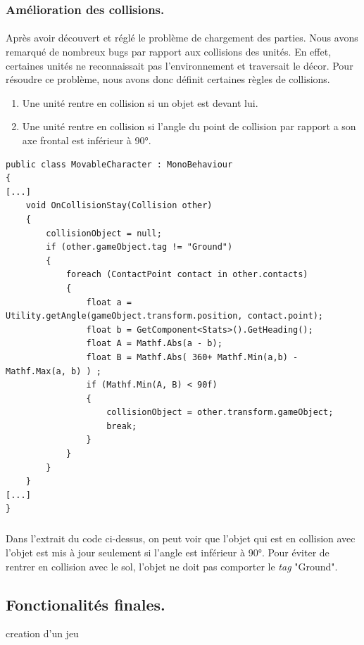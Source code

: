 \documentclass{report}
\begin{document}
\subsubsection{Amélioration des collisions.}
\paragraph{} Après avoir découvert et réglé le problème de chargement des parties. Nous avons remarqué de nombreux bugs par rapport aux collisions des unités. En effet, certaines unités ne reconnaissait pas l'environnement et traversait le décor. Pour résoudre ce problème, nous avons donc définit certaines règles de collisions.
\begin{enumerate}
\item Une unité rentre en collision si un objet est devant lui. 
\item Une unité rentre en collision si l'angle du point de collision par rapport a son axe frontal est inférieur à 90°.
\end{enumerate}

 \begin{lstlisting}[language={[Sharp]C},label={lst:MovableCharacterCollisionScript}, caption= Extrait du code de MovableCharacter.cs]
public class MovableCharacter : MonoBehaviour
{
[...]
    void OnCollisionStay(Collision other)
    {
        collisionObject = null;
        if (other.gameObject.tag != "Ground")
        {
            foreach (ContactPoint contact in other.contacts)
            {
                float a = Utility.getAngle(gameObject.transform.position, contact.point);
                float b = GetComponent<Stats>().GetHeading();
                float A = Mathf.Abs(a - b);
                float B = Mathf.Abs( 360+ Mathf.Min(a,b) - Mathf.Max(a, b) ) ;
                if (Mathf.Min(A, B) < 90f)
                {
                    collisionObject = other.transform.gameObject;
                    break;
                }
            }
        }
    }
[...]
}
\end{lstlisting}
\subparagraph{} Dans l'extrait du code ci-dessus, on peut voir que l'objet qui est en collision avec l'objet est mis à jour seulement si l'angle est inférieur à 90°. Pour éviter de rentrer en collision avec le sol, l'objet ne doit pas comporter le \textit{tag} "Ground".





\subsection{Fonctionalités finales.}
creation d'un jeu
\end{document}
